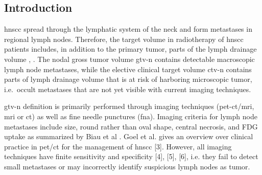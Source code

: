 \documentclass[\relativeRoot/main.tex]{subfiles}
\begin{document}
\subsection{Introduction}
\label{subsec:dataset:paper:introduction}

\Gls{hnscc} spread through the lymphatic system of the neck and form metastases in regional lymph nodes. Therefore, the target volume in radiotherapy of \gls{hnscc} patients includes, in addition to the primary tumor, parts of the lymph drainage volume \cite{biau_selection_2019}, \cite{grosu_target_2015}. The nodal gross tumor volume \gls{gtv-n} contains detectable macroscopic lymph node metastases, while the elective clinical target volume \gls{ctv-n} contains parts of lymph drainage volume that is at risk of harboring microscopic tumor, i.e.\ occult metastases that are not yet visible with current imaging techniques.

\Gls{gtv-n} definition is primarily performed through imaging techniques (\gls{pet}-\gls{ct}/\gls{mri}, \gls{mri} or \gls{ct}) as well as fine needle punctures (\gls{fna}). Imaging criteria for lymph node metastases include size, round rather than oval shape, central necrosis, and FDG uptake as summarized by Biau et al \cite{biau_selection_2019}. Goel et al. gives an overview over clinical practice in \gls{pet}/\gls{ct} for the management of \gls{hnscc} [3]. However, all imaging techniques have finite sensitivity and specificity [4], [5], [6], i.e. they fail to detect small metastases or may incorrectly identify suspicious lymph nodes as tumor.
\end{document}
